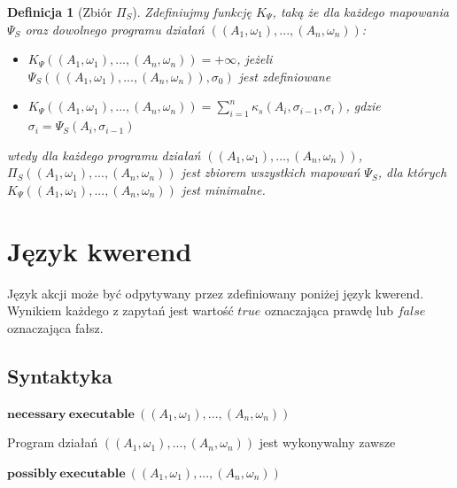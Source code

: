 \documentclass[11pt,a4paper]{article}
\newtheorem{definition}{Definicja}[section]
\begin{document}
    \begin{definition}[Zbiór $\Pi_S$]
    	Zdefiniujmy funkcję $K_{\Psi}$, taką że dla każdego mapowania $\Psi_S$ oraz dowolnego programu działań $((A_1, \omega_1),...,(A_n,\omega_n))$:
    	\begin{itemize}
    		\item $K_{\Psi}((A_1, \omega_1),...,(A_n,\omega_n)) = + \infty$, jeżeli $\Psi_S(((A_1, \omega_1),...,(A_n,\omega_n)), \sigma_0)$ jest zdefiniowane
    		\item $K_{\Psi}((A_1, \omega_1),...,(A_n,\omega_n)) = \sum_{i=1}^{n} \kappa_s(A_i, \sigma_{i-1}, \sigma_i)$, gdzie $\sigma_i = \Psi_S(A_i, \sigma_{i-1})$
    	\end{itemize}
    	
    	wtedy dla każdego programu działań $((A_1, \omega_1),...,(A_n,\omega_n))$, $\Pi_S((A_1, \omega_1),...,(A_n,\omega_n))$ jest zbiorem wszystkich mapowań $\Psi_S$, dla których $K_{\Psi}((A_1, \omega_1),...,(A_n,\omega_n))$ jest minimalne.
    \end{definition}
    
    \section{Język kwerend}
    
	Język akcji może być odpytywany przez zdefiniowany poniżej język kwerend. Wynikiem każdego z zapytań jest wartość $true$ oznaczająca prawdę lub $false$ oznaczająca fałsz.     
    
    \subsection{Syntaktyka}
    
    
    \begin{center}
        $\mathbf{necessary}~\mathbf{executable}~((A_1, \omega_1),...,(A_n,\omega_n))$
    \end{center}
    
    Program działań $((A_1, \omega_1),...,(A_n,\omega_n))$ jest wykonywalny zawsze
    
    \begin{center}
        $\mathbf{possibly}~\mathbf{executable}~((A_1, \omega_1),...,(A_n,\omega_n))$
    \end{center}
    
\end{document}
